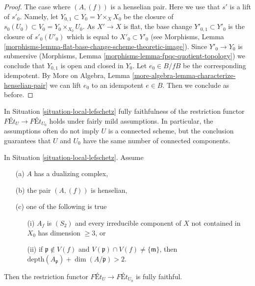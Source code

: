 \begin{proof}
\medskip\noindent
The case where $(A, (f))$ is a henselian pair. Here we use that $s'$ is
a lift of $s'_0$. Namely, let $Y_{0, 1} \subset Y_0 = Y \times_X X_0$
be the closure of $s_0(U_0) \subset V_0 = Y_0 \times_{X_0} U_0$.
As $X' \to X$ is flat, the base change $Y'_{0, 1} \subset Y'_0$
is the closure of $s'_0(U'_0)$ which is equal to $X'_0 \subset Y'_0$
(see Morphisms, Lemma
\ref{morphisms-lemma-flat-base-change-scheme-theoretic-image}).
Since $Y'_0 \to Y_0$ is submersive
(Morphisms, Lemma \ref{morphisms-lemma-fpqc-quotient-topology})
we conclude that $Y_{0, 1}$ is open and closed in $Y_0$.
Let $e_0 \in B/fB$ be the corresponding idempotent.
By More on Algebra, Lemma
\ref{more-algebra-lemma-characterize-henselian-pair}
we can lift $e_0$ to an idempotent $e \in B$.
Then we conclude as before.
\end{proof}

\noindent
In Situation \ref{situation-local-lefschetz}
fully faithfulness of the restriction functor
$\textit{F\'Et}_U \longrightarrow \textit{F\'Et}_{U_0}$
holds under fairly mild assumptions.
In particular, the assumptions often do not imply
$U$ is a connected scheme, but the conclusion guarantees
that $U$ and $U_0$ have the same number of connected components.

\begin{lemma}
\label{lemma-fully-faithful-simple}
In Situation \ref{situation-local-lefschetz}. Assume
\begin{enumerate}
\item[(a)] $A$ has a dualizing complex,
\item[(b)] the pair $(A, (f))$ is henselian,
\item[(c)] one of the following is true
\begin{enumerate}
\item[(i)] $A_f$ is $(S_2)$ and every irreducible component of $X$
not contained in $X_0$ has dimension $\geq 3$, or
\item[(ii)] if $\mathfrak p \not \in V(f)$ and
$V(\mathfrak p) \cap V(f) \not = \{\mathfrak m\}$, then
$\text{depth}(A_\mathfrak p) + \dim(A/\mathfrak p) > 2$.
\end{enumerate}
\end{enumerate}
Then the restriction functor
$\textit{F\'Et}_U \longrightarrow \textit{F\'Et}_{U_0}$
is fully faithful.
\end{lemma}

